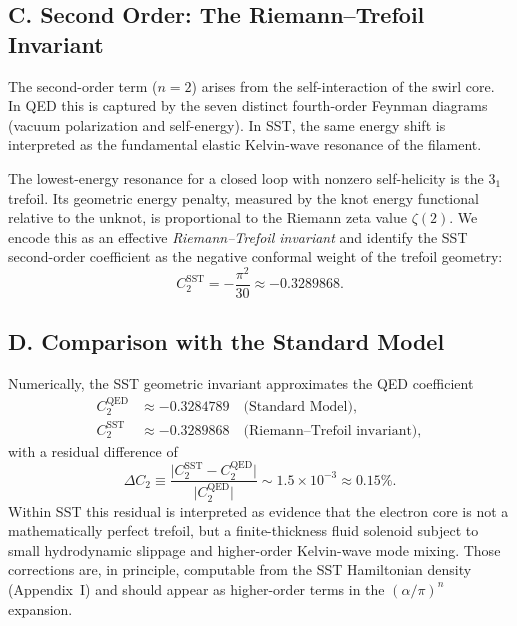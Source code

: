 \documentclass[10pt,reprint,aps,onecolumn,nofootinbib]{revtex4-2}
\begin{document}
\subsection*{C. Second Order: The Riemann--Trefoil Invariant}

    The second-order term ($n = 2$) arises from the self-interaction of the swirl core. In QED this is captured by the
    seven distinct fourth-order Feynman diagrams (vacuum polarization and self-energy). In SST, the same energy shift is
    interpreted as the fundamental elastic Kelvin-wave resonance of the filament.

    The lowest-energy resonance for a closed loop with nonzero self-helicity is the $3_1$ trefoil. Its geometric energy
    penalty, measured by the knot energy functional relative to the unknot, is proportional to the Riemann zeta value
    $\zeta(2)$. We encode this as an effective \emph{Riemann--Trefoil invariant} and identify the SST second-order
    coefficient as the negative conformal weight of the trefoil geometry:
    \begin{equation}
        C_2^{\text{SST}} = - \frac{\pi^2}{30} \approx -0.3289868 .
    \end{equation}

\subsection*{D. Comparison with the Standard Model}

    Numerically, the SST geometric invariant approximates the QED coefficient
    \begin{align}
        C_2^{\text{QED}} &\approx -0.3284789 \quad \text{(Standard Model)}, \\
        C_2^{\text{SST}} &\approx -0.3289868 \quad \text{(Riemann--Trefoil invariant)} ,
    \end{align}
    with a residual difference of
    \begin{equation}
        \Delta C_2 \equiv
        \frac{\bigl|C_2^{\text{SST}} - C_2^{\text{QED}}\bigr|}{\bigl|C_2^{\text{QED}}\bigr|}
        \sim 1.5 \times 10^{-3} \approx 0.15\% .
    \end{equation}
    Within SST this residual is interpreted as evidence that the electron core is not a mathematically perfect trefoil,
    but a finite-thickness fluid solenoid subject to small hydrodynamic slippage and higher-order Kelvin-wave mode
    mixing. Those corrections are, in principle, computable from the SST Hamiltonian density (Appendix~I)
    and should appear as higher-order terms in the $(\alpha/\pi)^n$ expansion.
\end{document}

